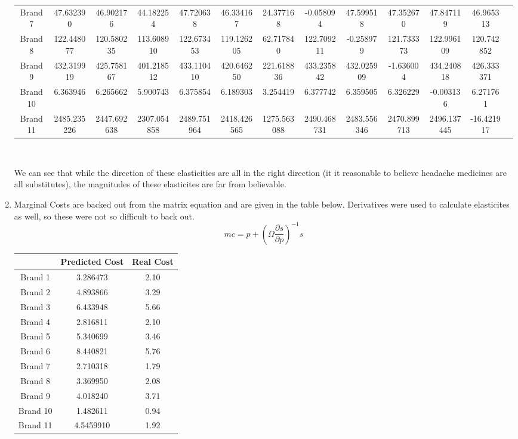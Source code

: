 \documentclass[10pt]{article}
\begin{document}
\begin{enumerate}
\begin{center}
{\begin{tabular}{c|cccccccccccc}
  Brand 7     &      47.632390     &      46.902176       &    44.182254     &      47.720638      &     46.334167    & 24.377168 &          -0.058094       &    47.599518      &    47.352670      &     47.847119      &     46.965313 \\
  Brand 8     &     122.448077     &     120.580235       &   113.608910     &     122.673453      &    119.126205    & 62.717840 &          122.709211      &     -0.258979     &    121.733373     &     122.996109     &     120.742852 \\
  Brand 9     &     432.319919     &     425.758167       &   401.218512     &     433.110410      &    420.646250    &  221.618836 &          433.235842    &      432.025909   &       -1.636004   &       434.240818   &       426.333371 \\
  Brand 10    &      6.363946      &      6.265662        &    5.900743      &      6.375854       &     6.189303     & 3.254419 &            6.377742       &     6.359505      &     6.326229      &     -0.003136      &      6.271761 \\
  Brand 11    &     2485.235226    &     2447.692638      &   2307.054858    &     2489.751964     &    2418.426565   & 1275.563088 &        2490.468731     &    2483.556346    &    2470.899713    &     2496.137445    &      -16.421917 \\
  \hline
\end{tabular}
} \\
\end{center}
We can see that while the direction of these elasticities are all in the right direction (it it reasonable to believe headache medicines are all substitutes), the magnitudes of these elasticites are far from believable.

\item Marginal Costs are backed out from the matrix equation and are given in the table below. Derivatives were used to calculate elasticites as well, so these were not so difficult to back out.
$$mc = p + \left(\Omega\frac{\partial s}{\partial p}\right)^{-1}s $$
\begin{center}
\begin{tabular}{c|cc}
  \hline
   	& Predicted Cost & Real Cost \\
\hline
Brand 1	   & 3.286473 & 2.10 \\
Brand 2    & 4.893866 & 3.29  \\
Brand 3    & 6.433948  & 5.66 \\
Brand 4    & 2.816811  & 2.10\\
Brand 5    & 5.340699 & 3.46\\
Brand 6    & 8.440821 & 5.76\\
Brand 7    & 2.710318 & 1.79 \\
Brand 8    & 3.369950  & 2.08\\
Brand 9    & 4.018240  & 3.71\\
Brand 10    & 1.482611 &  0.94\\
Brand 11    & 4.5459910 & 1.92\\
\hline
\end{tabular}
\end{center}


\end{enumerate}
\end{document}
